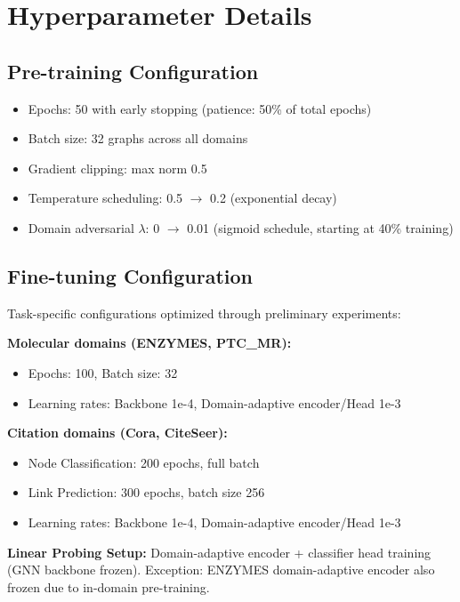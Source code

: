 \documentclass[11pt]{article}
\begin{document}
\section{Hyperparameter Details}

\subsection{Pre-training Configuration}
\begin{itemize}
\item Epochs: 50 with early stopping (patience: 50\% of total epochs)
\item Batch size: 32 graphs across all domains
\item Gradient clipping: max norm 0.5
\item Temperature scheduling: 0.5 $\rightarrow$ 0.2 (exponential decay)
\item Domain adversarial $\lambda$: 0 $\rightarrow$ 0.01 (sigmoid schedule, starting at 40\% training)
\end{itemize}

\subsection{Fine-tuning Configuration}
Task-specific configurations optimized through preliminary experiments:

\textbf{Molecular domains (ENZYMES, PTC\_MR):}
\begin{itemize}
\item Epochs: 100, Batch size: 32
\item Learning rates: Backbone 1e-4, Domain-adaptive encoder/Head 1e-3
\end{itemize}

\textbf{Citation domains (Cora, CiteSeer):}
\begin{itemize}
\item Node Classification: 200 epochs, full batch
\item Link Prediction: 300 epochs, batch size 256
\item Learning rates: Backbone 1e-4, Domain-adaptive encoder/Head 1e-3
\end{itemize}

\textbf{Linear Probing Setup:} Domain-adaptive encoder + classifier head training (GNN backbone frozen). Exception: ENZYMES domain-adaptive encoder also frozen due to in-domain pre-training.
\end{document}
